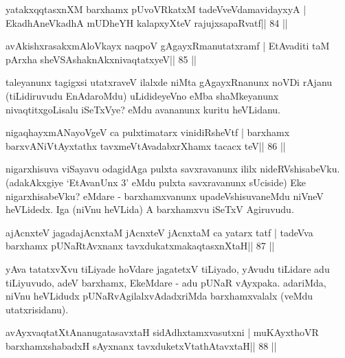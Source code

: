 \begin{shl}
yatakxqqtasxnXM barxhamx pUvoVRkatxM tadeVveVdamavidayxyA |
EkadhA\s neVkadhA mUDheYH kalapxyXteV rajujxsapaRvatf\hfill || 84 ||
\end{shl}

\begin{shl}
avAkishxrasakxmAloVkayx naqpoV gAgayxRmanutatxramf |
EtAvaditi taM pArxha sheVSAshaknAkxnivaqtatxyeV\hfill || 85 ||
\end{shl}

\begin{artha}
taleyanunx tagigxsi utatxraveV ilalxde niMta gAgayxRnanunx noVDi rAjanu (tiLidiruvudu EnAdaroMdu) uLidideyeVno eMba shaMkeyanunx nivaqtitxgoLisalu iSeTxVye? eMdu avananunx kuritu heVLidanu.
\end{artha} 

\begin{shl}
nigaqhayxmANayoVgeV ca pulxtimatarx vinidiRsheVtf |
barxhamx barxvANiVtAyxtathx tavxmeVtAvadabxrXhamx tacacx teV\hfill || 86 ||
\end{shl}

\begin{artha}
nigarxhisuva viSayavu odagidAga pulxta savxravanunx ililx  nideRVshisabeVku. (adakAkxgiye `EtAvanUnx 3' eMdu pulxta savxravanunx  sUciside) Eke nigarxhisabeVku? eMdare - barxhamxvanunx upadeVshisuvaneMdu niVneV heVLidedx. Iga (niVnu heVLida) A barxhamxvu iSeTxV Agiruvudu.
\end{artha}


\begin{shl}
ajAcnxteV jagadajAcnxtaM jAcnxteV jAcnxtaM ca yatarx tatf |
tadeVva barxhamx pUNaRtAvxnanx tavxdukatxmakaqtasxnXtaH\hfill || 87 ||
\end{shl}

\begin{artha}
yAva tatatxvXvu tiLiyade hoVdare jagatetxV tiLiyado, yAvudu tiLidare adu  tiLiyuvudo, adeV barxhamx, EkeMdare - adu pUNaR vAyxpaka. adariMda, niVnu heVLidudx pUNaRvAgilalxvAdadxriMda barxhamxvalalx (veMdu utatxrisidanu).
\end{artha}

\begin{shl}
avAyxvaqtatXtAnanugatasavxtaH sidAdhxtamxvasutxni |
muKAyxthoVR barxhamxshabadxH sAyxnanx tavxduketxV\s tathAtavxtaH\hfill || 88 ||
\end{shl}

